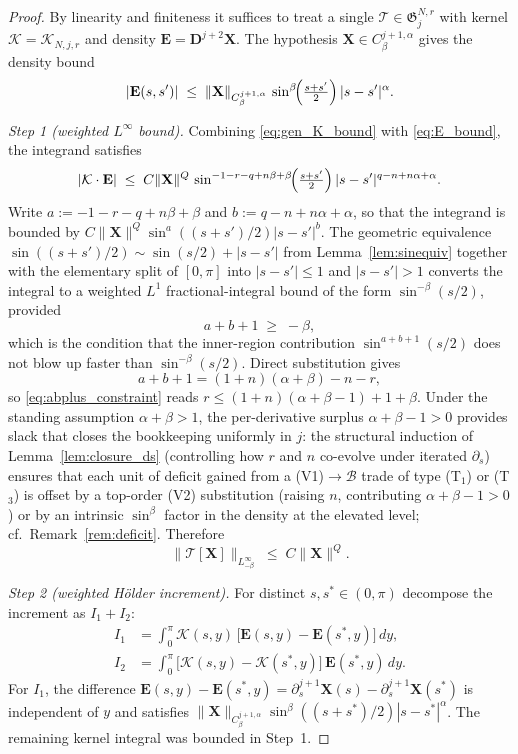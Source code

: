 \documentclass{amsart}
\begin{document}
\begin{proof}
By linearity and finiteness it suffices to treat a single $\mathcal{T} \in \mathfrak{G}_j^{N,r}$ with kernel $\mathcal{K} = \mathcal{K}_{N,j,r}$ and density $\mathbf{E} = \mathbf{D}^{j+2}\mathbf{X}$.  The hypothesis $\mathbf{X} \in C^{j+1,\alpha}_\beta$ gives the density bound
\begin{equation}\label{eq:E_bound}
|\mathbf{E}(s,s')| \;\le\; \|\mathbf{X}\|_{C^{j+1,\alpha}_\beta}\,
\sin^\beta\!\Bigl(\tfrac{s+s'}{2}\Bigr)\,|s-s'|^\alpha.
\end{equation}

\emph{Step 1 (weighted $L^\infty$ bound).}
Combining \eqref{eq:gen_K_bound} with \eqref{eq:E_bound}, the integrand satisfies
\[
|\mathcal{K}\cdot\mathbf{E}|
 \;\le\; C\|\mathbf{X}\|^{Q}\,
 \sin^{-1-r-q+n\beta+\beta}\!\Bigl(\tfrac{s+s'}{2}\Bigr)\,
 |s-s'|^{q-n+n\alpha+\alpha}.
\]
Write $a := -1 - r - q + n\beta + \beta$ and $b := q - n + n\alpha + \alpha$, so that the integrand is bounded by $C\|\mathbf{X}\|^Q\sin^a((s+s')/2)|s-s'|^b$. The geometric equivalence $\sin((s+s')/2) \sim \sin(s/2) + |s-s'|$ from Lemma~\ref{lem:sinequiv} together with the elementary split of $[0,\pi]$ into $|s-s'| \le 1$ and $|s-s'| > 1$ converts the integral to a weighted $L^1$ fractional-integral bound of the form $\sin^{-\beta}(s/2)$, provided
\begin{equation}\label{eq:abplus_constraint}
a + b + 1 \;\ge\; -\beta,
\end{equation}
which is the condition that the inner-region contribution $\sin^{a+b+1}(s/2)$ does not blow up faster than $\sin^{-\beta}(s/2)$. Direct substitution gives
\[
a + b + 1 = (1+n)(\alpha+\beta) - n - r,
\]
so \eqref{eq:abplus_constraint} reads $r \le (1+n)(\alpha+\beta-1) + 1 + \beta$. Under the standing assumption $\alpha + \beta > 1$, the per-derivative surplus $\alpha + \beta - 1 > 0$ provides slack that closes the bookkeeping uniformly in $j$: the structural induction of Lemma~\ref{lem:closure_ds} (controlling how $r$ and $n$ co-evolve under iterated $\partial_s$) ensures that each unit of deficit gained from a (V1)$\to \mathcal{B}$ trade of type (T$_1$) or (T$_3$) is offset by a top-order (V2) substitution (raising $n$, contributing $\alpha+\beta-1>0$) or by an intrinsic $\sin^\beta$ factor in the density at the elevated level; cf.\ Remark~\ref{rem:deficit}. Therefore
\[
\|\mathcal{T}[\mathbf{X}]\|_{L^\infty_{-\beta}}
\;\le\; C\|\mathbf{X}\|^{Q}.
\]

\emph{Step 2 (weighted Hölder increment).}
For distinct $s, s^* \in (0,\pi)$ decompose the increment as $I_1 + I_2$:
\begin{align*}
I_1 &= \int_0^\pi \mathcal{K}(s, y)\,\bigl[\mathbf{E}(s, y) - \mathbf{E}(s^*, y)\bigr]\,dy,\\
I_2 &= \int_0^\pi \bigl[\mathcal{K}(s, y) - \mathcal{K}(s^*, y)\bigr]\,
      \mathbf{E}(s^*, y)\,dy.
\end{align*}
For $I_1$, the difference $\mathbf{E}(s, y) - \mathbf{E}(s^*, y) = \partial_s^{j+1}\mathbf{X}(s) - \partial_s^{j+1}\mathbf{X}(s^*)$ is independent of $y$ and satisfies
$\|\mathbf{X}\|_{C^{j+1,\alpha}_\beta}\sin^\beta((s+s^*)/2)|s-s^*|^\alpha$. The remaining kernel integral was bounded in Step~1.


\end{proof}
\end{document}
